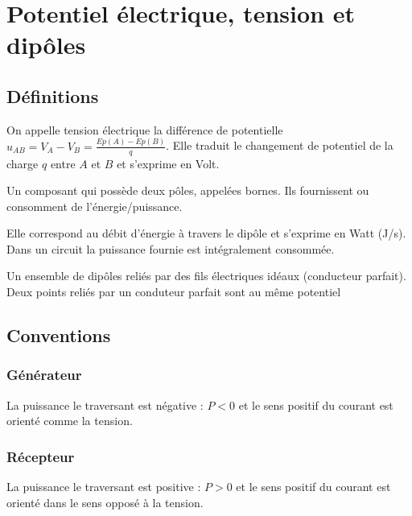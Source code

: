 \documentclass[french]{yLectureNote}
\renewcommand{\vec}{\overrightarrow}
\begin{document}
\section{Potentiel électrique, tension et dip\^oles}
\subsection{Définitions}
%
\begin{definition}

On appelle tension électrique la différence de potentielle \(u_{AB} = V_A - V_B = \frac{Ep(A)-Ep(B)}{q}\). Elle traduit le changement de potentiel de la charge $q$ entre \(A\) et \(B\) et s'exprime en Volt.
\end{definition}
\begin{definition}
Un composant qui possède deux p\^oles, appelées bornes. Ils fournissent ou consomment de l'énergie/puissance.
\end{definition}
\begin{definition}[Puissance]
Elle correspond au débit d'énergie à travers le dip\^ole et s'exprime en Watt (J/s). Dans un circuit la puissance fournie est intégralement consommée.
\end{definition}
\begin{definition}[Circuit]
Un ensemble de dip\^oles reliés par des fils électriques idéaux (conducteur parfait). Deux points reliés par un conduteur parfait sont au m\^eme potentiel
\end{definition}
\subsection{Conventions}
\subsubsection{Générateur}
La puissance le traversant est négative : \(P<0\) et le sens positif du courant est orienté comme la tension.
\subsubsection{Récepteur}
La puissance le traversant est positive : \(P>0\) et le sens positif du courant est orienté dans le sens {\color{criticalColor}opposé} à la tension.
\end{document}
